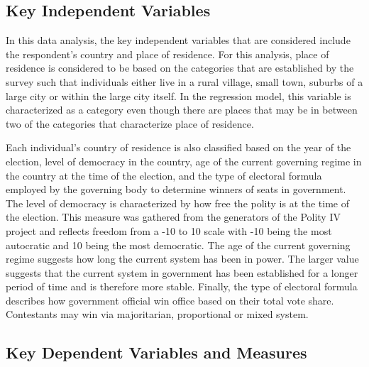 \documentclass[12pt, titlepage]{article}
\begin{document}
\subsection{Key Independent Variables}

In this data analysis, the key independent variables that are considered include the respondent's country and place of residence. For this analysis, place of residence is considered to be based on the categories that are established by the survey such that individuals either live in a rural village, small town, suburbs of a large city or within the large city itself. In the regression model, this variable is characterized as a category even though there are places that may be in between two of the categories that characterize place of residence. 

Each individual's country of residence is also classified based on the year of the election, level of democracy in the country,  age of the current governing regime in the country at the time of the election, and the type of electoral formula employed by the governing body to determine winners of seats in government. The level of democracy is characterized by how free the polity is at the time of the election. This measure was gathered from the generators of the Polity IV project and reflects freedom from a -10 to 10 scale with -10 being the most autocratic and 10 being the most democratic. The age of the current governing regime suggests how long the current system has been in power. The larger value suggests that the current system in government has been established for a longer period of time and is therefore more stable. Finally, the type of electoral formula describes how government official win office based on their total vote share. Contestants may win via majoritarian, proportional or mixed system. 

\subsection{Key Dependent Variables and Measures}
\end{document}
